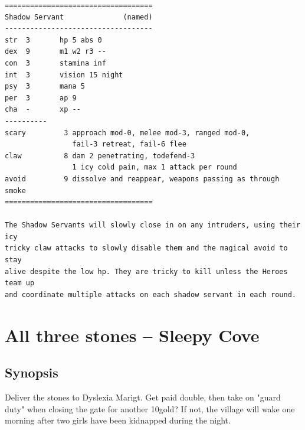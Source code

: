 \documentclass[11pt, twoside, titlepage, a4paper]{report}
\renewcommand{\chaptermark}[1]{\markboth{#1}{}}
\begin{document}
\begin{verbatim}
\end{verbatim} \goodbreak \begin{verbatim}
===================================
Shadow Servant              (named)
-----------------------------------
str  3       hp 5 abs 0
dex  9       m1 w2 r3 --
con  3       stamina inf
int  3       vision 15 night
psy  3       mana 5
per  3       ap 9
cha  -       xp --
----------
scary         3 approach mod-0, melee mod-3, ranged mod-0,
                fail-3 retreat, fail-6 flee
claw          8 dam 2 penetrating, todefend-3
                1 icy cold pain, max 1 attack per round
avoid         9 dissolve and reappear, weapons passing as through smoke
===================================

The Shadow Servants will slowly close in on any intruders, using their icy
tricky claw attacks to slowly disable them and the magical avoid to stay
alive despite the low hp. They are tricky to kill unless the Heroes team up
and coordinate multiple attacks on each shadow servant in each round.

\end{verbatim} \normalsize

















\clearpage
{}
\section*{All three stones -- Sleepy Cove}
\chaptermark{all three stones}


\subsection*{Synopsis}
Deliver the stones to Dyslexia Marigt. Get paid double, then take on "guard duty" when closing the gate for another 10gold? If not, the village will wake one morning after two girls have been kidnapped during the night.
\end{document}
